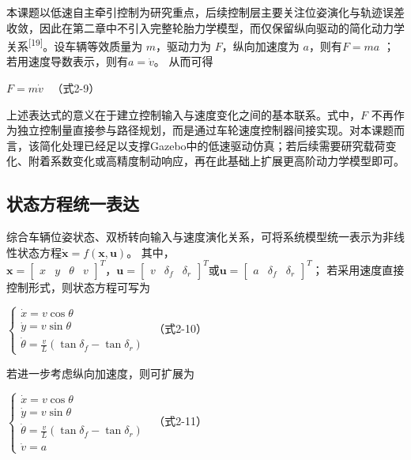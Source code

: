 \documentclass[UTF8,a4paper,12pt]{ctexart}
\begin{document}
本课题以低速自主牵引控制为研究重点，后续控制层主要关注位姿演化与轨迹误差收敛，因此在第二章中不引入完整轮胎力学模型，而仅保留纵向驱动的简化动力学关系\textsuperscript{[19]}。设车辆等效质量为 \(m\)，驱动力为 \(F\)，纵向加速度为 \(a\)，则有\(F = ma\) ；若用速度导数表示，则有\(a = \dot{v}\)。\(
\) 从而可得

\(F = m\dot{v}\ \ \) （式2-9）

上述表达式的意义在于建立控制输入与速度变化之间的基本联系。式中，\(F\) 不再作为独立控制量直接参与路径规划，而是通过车轮速度控制器间接实现。对本课题而言，该简化处理已经足以支撑Gazebo中的低速驱动仿真；若后续需要研究载荷变化、附着系数变化或高精度制动响应，再在此基础上扩展更高阶动力学模型即可。

\subsection{状态方程统一表达}\label{_Toc229105311}

综合车辆位姿状态、双桥转向输入与速度演化关系，可将系统模型统一表示为非线性状态方程\(\dot{\mathbf{x}} = f(\mathbf{x},\mathbf{u})\)。\(
\) 其中，\(\mathbf{x} = \begin{bmatrix}
x & y & \theta & v
\end{bmatrix}^{T}，\mathbf{u} = \begin{bmatrix}
v & \delta_{f} & \delta_{r}
\end{bmatrix}^{T}\text{或}\mathbf{u} = \begin{bmatrix}
a & \delta_{f} & \delta_{r}
\end{bmatrix}^{T}\)；\(
\) 若采用速度直接控制形式，则状态方程可写为

\(\left\{ \begin{array}{r}
\dot{x} = v\cos\theta \\
\dot{y} = v\sin\theta \\
\dot{\theta} = \frac{v}{L}\left( \tan\delta_{f} - \tan\delta_{r} \right)
\end{array} \right.\ \) （式2-10）

若进一步考虑纵向加速度，则可扩展为

\(\left\{ \begin{array}{r}
\dot{x} = v\cos\theta \\
\dot{y} = v\sin\theta \\
\dot{\theta} = \frac{v}{L}\left( \tan\delta_{f} - \tan\delta_{r} \right) \\
\dot{v} = a
\end{array} \right.\ \) （式2-11）
\end{document}
